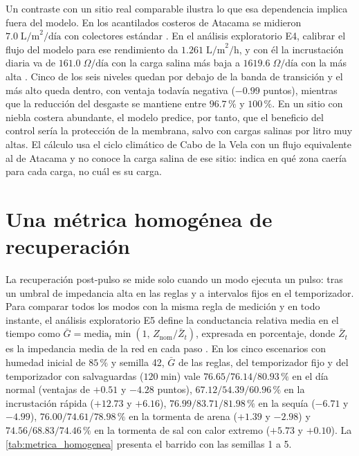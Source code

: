 Un contraste con un sitio real comparable ilustra lo que esa dependencia implica fuera del modelo. En los acantilados costeros de Atacama se midieron $7.0\;\text{L/m}^2\text{/d\'ia}$ con colectores est\'andar \parencite{cereceda2008spatial}. En el an\'alisis exploratorio E4, calibrar el flujo del modelo para ese rendimiento da $1.261\;\text{L/m}^2\text{/h}$, y con \'el la incrustaci\'on diaria va de $161.0\;\Omega\text{/d\'ia}$ con la carga salina m\'as baja a $1619.6\;\Omega\text{/d\'ia}$ con la m\'as alta \parencite[doc.~04, \S~8.13]{axioma2026engine}. Cinco de los seis niveles quedan por debajo de la banda de transici\'on y el m\'as alto queda dentro, con ventaja todav\'ia negativa ($-0.99$ puntos), mientras que la reducci\'on del desgaste se mantiene entre $96.7\,\%$ y $100\,\%$. En un sitio con niebla costera abundante, el modelo predice, por tanto, que el beneficio del control ser\'ia la protecci\'on de la membrana, salvo con cargas salinas por litro muy altas. El c\'alculo usa el ciclo clim\'atico de Cabo de la Vela con un flujo equivalente al de Atacama y no conoce la carga salina de ese sitio: indica en qu\'e zona caer\'ia para cada carga, no cu\'al es su carga.

\section{Una m\'etrica homog\'enea de recuperaci\'on}
\label{sec:metrica_homogenea}
La recuperaci\'on post-pulso se mide solo cuando un modo ejecuta un pulso: tras un umbral de impedancia alta en las reglas y a intervalos fijos en el temporizador. Para comparar todos los modos con la misma regla de medici\'on y en todo instante, el an\'alisis exploratorio E5 define la conductancia relativa media en el tiempo como $\bar{G} = \text{media}_t\min(1,\,Z_{\text{nom}}/\bar{Z}_t)$, expresada en porcentaje, donde $\bar{Z}_t$ es la impedancia media de la red en cada paso \parencite[doc.~04, \S~8.14]{axioma2026engine}. En los cinco escenarios con humedad inicial de $85\,\%$ y semilla 42, $\bar{G}$ de las reglas, del temporizador fijo y del temporizador con salvaguardas ($120\;\text{min}$) vale $76.65 / 76.14 / 80.93\,\%$ en el d\'ia normal (ventajas de $+0.51$ y $-4.28$ puntos), $67.12 / 54.39 / 60.96\,\%$ en la incrustaci\'on r\'apida ($+12.73$ y $+6.16$), $76.99 / 83.71 / 81.98\,\%$ en la sequ\'ia ($-6.71$ y $-4.99$), $76.00 / 74.61 / 78.98\,\%$ en la tormenta de arena ($+1.39$ y $-2.98$) y $74.56 / 68.83 / 74.46\,\%$ en la tormenta de sal con calor extremo ($+5.73$ y $+0.10$). La \cref{tab:metrica_homogenea} presenta el barrido con las semillas 1 a 5.

